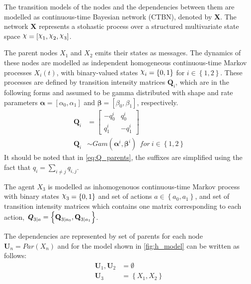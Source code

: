 The transition models of the nodes and the dependencies between them are modelled as continuous-time Bayesian network (CTBN), denoted by \textbf{X}. The network \textbf{X} represents a stohastic process over a structured multivariate state space $ \rchi = [\rchi_1, \rchi_2, \rchi_3] $. 

The parent nodes $X_{1}$ and $ X_{2} $ emits their states as messages. The dynamics  of these nodes are modelled as independent homogeneous continuous-time Markov processes $X_{i}(t)$, with binary-valued states $ \rchi_{i} = \left\lbrace 0, 1 \right\rbrace  $ for $ i \in \left\lbrace 1,2 \right\rbrace $. These processes are defined by transition intensity matrices $ \textbf{Q}_{i} $, which are in the following forms and assumed to be gamma distributed with shape and rate parameters $ \boldsymbol{\alpha} = [\alpha_0, \alpha_1] $ and $ \boldsymbol{\beta} = [\beta_0, \beta_1] $, respectively.
\begin{align}
\textbf{Q}_i &= 
\begin{bmatrix}
-q^i_{0} & q^i_{0} \\
q^i_{1} &  -q^i_{1}
\end{bmatrix}
\label{eq:Q_parents}\\
\textbf{Q}_{i} &\sim Gam(\boldsymbol{\alpha}^i, \boldsymbol{\beta}^i)\ \ for\ i \in \left\lbrace 1,2\right\rbrace \label{eq:gamma_priors}
\end{align}
It should be noted that in \autoref{eq:Q_parents}, the suffixes are simplified using the fact that $ q_{i} = \sum_{i \neq j} q_{i,j}$.

The agent  $ X_{3} $ is modelled as inhomogenouos continuous-time Markov process with binary states $ \rchi_{3} = \left\lbrace 0, 1 \right\rbrace  $ and set of actions $ a \in \left\lbrace a_0, a_1\right\rbrace  $, and set of transition intensity matrices which contains one matrix corresponding to each action, $ \textbf{\textit{Q}}_{3 \mid a} = \left\lbrace \textbf{Q}_{3\mid a_{0}}, \textbf{Q}_{3\mid a_{1}} \right\rbrace $.

The dependencies are represented by set of parents for each node $ \textbf{U}_{n} = Par(X_n) $ and for the model shown in \cref{fig:h_model} can be written as follows:
\begin{align*}
\textbf{U}_{1}, \textbf{U}_{2} & = \emptyset \\
\textbf{U}_{3} & = \left\lbrace X_1, X_2 \right\rbrace 
\end{align*}

